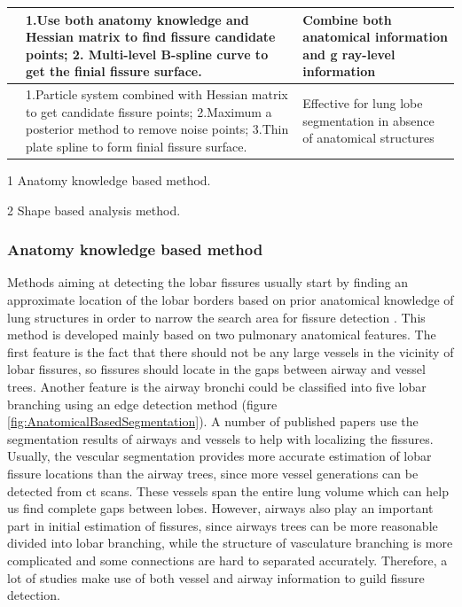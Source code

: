 \begin{table}[htbp]
\begin{threeparttable}
\begin{tabular}{|p{4.3cm}|p{6.3cm}|p{4.8cm}|}
\hline
\cite{doel2012pulmonary} & 1.Use both anatomy knowledge and Hessian matrix to find fissure candidate points; 2. Multi-level B-spline curve to get the finial fissure surface. & Combine both anatomical information and g ray-level information\tnote{1,2}\\
\hline
\cite{ross2010automatic,ross2013pulmonary} & 1.Particle system combined with Hessian matrix to get candidate fissure points; 2.Maximum a posterior method to remove noise points; 3.Thin plate spline to form finial fissure surface. & Effective for lung lobe segmentation in absence of anatomical structures\tnote{2}\\
\hline
\end{tabular}
\begin{tablenotes}
        \footnotesize
        \item[1] Anatomy knowledge based method.
        \item[2] Shape based analysis method.
\end{tablenotes}
\end{threeparttable}
\end{table}

\subsubsection{Anatomy knowledge based method}
Methods aiming at detecting the lobar fissures usually start by finding an approximate location of the lobar borders based on prior anatomical knowledge of lung structures in order to narrow the search area for fissure detection \citep{kuhnigk2003lung,kuhnigk2005informatics,zhou2004automatic,saita2006algorithm,zhang2006atlas,ukil2009anatomy,pu2009computational,lassen2010automatic,doel2012pulmonary}. This method is developed mainly based on two pulmonary anatomical features. The first feature is the fact that there should not be any large vessels in the vicinity of lobar fissures, so fissures should locate in the gaps between airway and vessel trees. Another feature is the airway bronchi could be classified into five lobar branching using an edge detection method (figure \ref{fig:AnatomicalBasedSegmentation}). A number of published papers use the segmentation results of airways and vessels to help with localizing the fissures. Usually, the vescular segmentation provides more accurate estimation of lobar fissure locations than the airway trees, since more vessel generations can be detected from \gls{ct} scans. These vessels span the entire lung volume which can help us find complete gaps between lobes. However, airways also play an important part in initial estimation of fissures, since airways trees can be more reasonable divided into lobar branching, while the structure of vasculature branching is more complicated and some connections are hard to separated accurately. Therefore, a lot of studies make use of both vessel and airway information to guild fissure detection.

